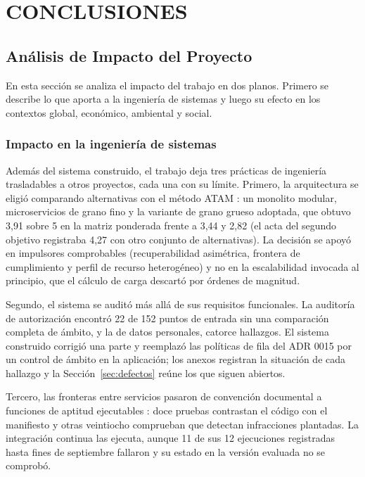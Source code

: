  \setcounter{subsection}{0}

\section{CONCLUSIONES}

\subsection{Análisis de Impacto del Proyecto}

En esta sección se analiza el impacto del trabajo en dos planos. Primero se describe lo que aporta a la ingeniería de sistemas y luego su efecto en los contextos global, económico, ambiental y social.

\subsubsection{Impacto en la ingeniería de sistemas}

Además del sistema construido, el trabajo deja tres prácticas de ingeniería trasladables a otros proyectos, cada una con su límite. Primero, la arquitectura se eligió comparando alternativas con el método ATAM \citep{bass_software_2021}: un monolito modular, microservicios de grano fino y la variante de grano grueso adoptada, que obtuvo 3,91 sobre 5 en la matriz ponderada frente a 3,44 y 2,82 (el acta del segundo objetivo registraba 4,27 con otro conjunto de alternativas). La decisión se apoyó en impulsores comprobables (recuperabilidad asimétrica, frontera de cumplimiento y perfil de recurso heterogéneo) y no en la escalabilidad invocada al principio, que el cálculo de carga descartó por órdenes de magnitud.

Segundo, el sistema se auditó más allá de sus requisitos funcionales. La auditoría de autorización encontró 22 de 152 puntos de entrada sin una comparación completa de ámbito, y la de datos personales, catorce hallazgos. El sistema construido corrigió una parte y reemplazó las políticas de fila del ADR 0015 por un control de ámbito en la aplicación; los anexos registran la situación de cada hallazgo y la Sección~\ref{sec:defectos} reúne los que siguen abiertos.

Tercero, las fronteras entre servicios pasaron de convención documental a funciones de aptitud ejecutables \citep{ford_building_2017}: doce pruebas contrastan el código con el manifiesto y otras veintiocho comprueban que detectan infracciones plantadas. La integración continua las ejecuta, aunque 11 de sus 12 ejecuciones registradas hasta fines de septiembre fallaron y su estado en la versión evaluada no se comprobó.

